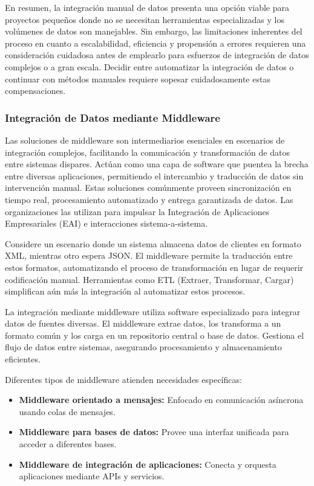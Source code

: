 \documentclass[12pt]{book}
\begin{document}
En resumen, la integración manual de datos presenta una opción viable para proyectos pequeños donde no se necesitan herramientas especializadas y los volúmenes de datos son manejables. Sin embargo, las limitaciones inherentes del proceso en cuanto a escalabilidad, eficiencia y propensión a errores requieren una consideración cuidadosa antes de emplearlo para esfuerzos de integración de datos complejos o a gran escala. Decidir entre automatizar la integración de datos o continuar con métodos manuales requiere sopesar cuidadosamente estas compensaciones.
\subsubsection{Integración de Datos mediante Middleware}

Las soluciones de middleware son intermediarios esenciales en escenarios de integración complejos, facilitando la comunicación y transformación de datos entre sistemas dispares. Actúan como una capa de software que puentea la brecha entre diversas aplicaciones, permitiendo el intercambio y traducción de datos sin intervención manual. Estas soluciones comúnmente proveen sincronización en tiempo real, procesamiento automatizado y entrega garantizada de datos. Las organizaciones las utilizan para impulsar la Integración de Aplicaciones Empresariales (EAI) e interacciones sistema-a-sistema.

Considere un escenario donde un sistema almacena datos de clientes en formato XML, mientras otro espera JSON. El middleware permite la traducción entre estos formatos, automatizando el proceso de transformación en lugar de requerir codificación manual. Herramientas como ETL (Extraer, Transformar, Cargar) simplifican aún más la integración al automatizar estos procesos.

La integración mediante middleware utiliza software especializado para integrar datos de fuentes diversas. El middleware extrae datos, los transforma a un formato común y los carga en un repositorio central o base de datos. Gestiona el flujo de datos entre sistemas, asegurando procesamiento y almacenamiento eficientes.

Diferentes tipos de middleware atienden necesidades específicas:

\begin{itemize}
    \item \textbf{Middleware orientado a mensajes:} Enfocado en comunicación asíncrona usando colas de mensajes.
    \item \textbf{Middleware para bases de datos:} Provee una interfaz unificada para acceder a diferentes bases.
    \item \textbf{Middleware de integración de aplicaciones:} Conecta y orquesta aplicaciones mediante APIs y servicios.
\end{itemize}
\end{document}
